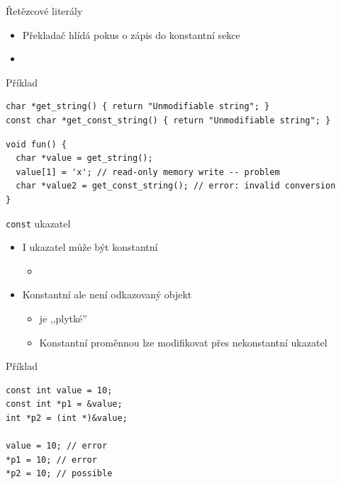 \begin{frame}[fragile]{Řetězcové literály}


   
  \begin{itemize}
    \item Překladač hlídá pokus o zápis do konstantní sekce
    \item {}
  \end{itemize}


\begin{block}{Příklad}
\begin{lstlisting}
char *get_string() { return "Unmodifiable string"; }
const char *get_const_string() { return "Unmodifiable string"; }
\end{lstlisting}
\begin{lstlisting}
void fun() {
  char *value = get_string();
  value[1] = 'x'; // read-only memory write -- problem
  char *value2 = get_const_string(); // error: invalid conversion
}
\end{lstlisting}
\end{block}

\end{frame}

\begin{frame}[fragile]{\texttt{const} ukazatel}

  \begin{itemize}
    \item I ukazatel může být konstantní
    \begin{itemize}
      \item {}
    \end{itemize}

    \pause

    \item Konstantní ale není odkazovaný objekt
    \begin{itemize}
      \item {} je ,,plytké''
      \item Konstantní proměnnou lze modifikovat přes nekonstantní ukazatel
    \end{itemize}

  \end{itemize}

  \pause

\begin{block}{Příklad}
\begin{lstlisting}
const int value = 10;
const int *p1 = &value;
int *p2 = (int *)&value;

value = 10; // error
*p1 = 10; // error
*p2 = 10; // possible
\end{lstlisting}
\end{block}

\end{frame}

